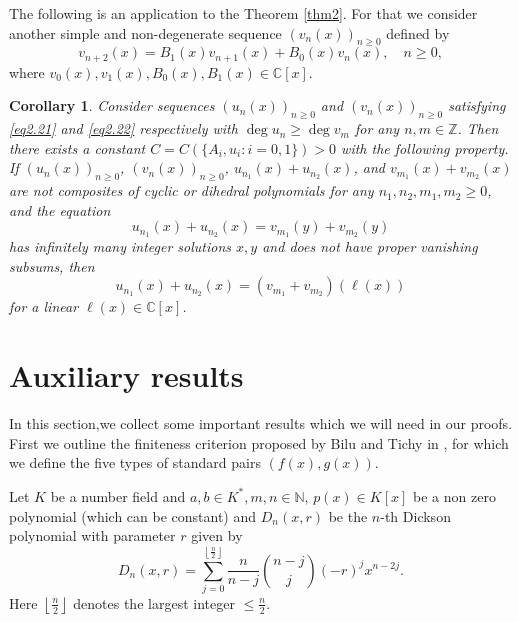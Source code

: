 \documentclass[12pt]{amsart}
\newtheorem{corollary}[theorem]{Corollary}
\newcommand{\Z}{\mbox{$\mathbb Z$}}
\newcommand{\N}{\mbox{$\mathbb N$}}     %
\newcommand{\C}{\mbox{$\mathbb C$}}     %
\begin{document}
The following is an application to the Theorem \ref{thm2}. For that we consider another simple and non-degenerate sequence $(v_n(x))_{n\geq0}$ defined by
\begin{equation}\label{eq2.22}
		v_{n+2}(x)=B_1(x)v_{n+1}(x)+B_0(x)v_n(x), \quad n\geq 0,
\end{equation} where $v_0(x),v_1(x),B_0(x),B_1(x)\in \C[x]$.
	\begin{corollary}\label{corolary1}
	 Consider sequences $(u_n(x))_{n\geq 0}$ and $(v_n(x))_{n\geq 0}$ satisfying \eqref{eq2.21} and \eqref{eq2.22} respectively with $\deg u_n \geq \deg v_m$ for any $n,m\in \Z$. Then there exists a constant $C=C(\{A_i,u_i : i=0,1\})>0$ with the following property. If $(u_n(x))_{n\geq0}$, $(v_n(x))_{n\geq 0}$,  $u_{n_1}(x)+u_{n_2}(x)$, and $v_{m_1}(x)+v_{m_2}(x)$ are not composites of cyclic or dihedral polynomials for any $n_1,n_2,m_1,m_2 \geq 0$, and the equation 
     \begin{equation*}
         u_{n_1}(x)+u_{n_2}(x)=v_{m_1}(y)+v_{m_2}(y)
     \end{equation*} has infinitely many integer solutions $x,y$ and does not have proper vanishing subsums, then \[u_{n_1}(x)+u_{n_2}(x)=(v_{m_1}+v_{m_2})(\ell(x))\] for a linear $\ell(x)\in \C[x]$.
	\end{corollary}
    \section{Auxiliary results} \label{sec:auxiliary}
    In this section,we collect some important results which we will need in our proofs. First we outline the finiteness criterion proposed by Bilu and Tichy in \cite{bilu2000diophantine}, for which we define the five types of standard pairs $(f(x),g(x))$.
	 
	Let $K$ be a number field and $a,b\in K^{*}, m,n\in \N,\,  p(x)\in K[x]$ be a non zero polynomial (which can be constant) and $D_n(x,r)$ be the $n$-th Dickson polynomial with parameter $r$ given by
	\[D_n(x,r)=\sum_{j=0}^{\left\lfloor \frac{n}{2}\right\rfloor}\frac{n}{n-j}\binom{n-j}{j}(-r)^jx^{n-2j}.\]
	Here $\left\lfloor \frac{n}{2}\right\rfloor$ denotes the largest integer $\leq \frac{n}{2}$.
\end{document}
